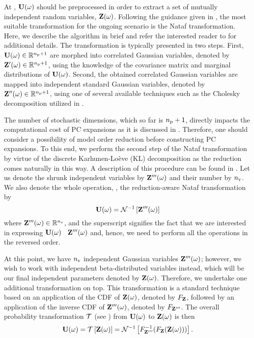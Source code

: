 At , $\mathbf{U}(\omega)$ should be preprocessed in order to extract a set of mutually independent random variables, $\mathbf{Z}(\omega)$.
Following the guidance given in , the most suitable transformation for the ongoing scenario is the Nataf transformation.
Here, we describe the algorithm in brief and refer the interested reader to \cite{li2008} for additional details. The transformation is typically presented in two steps.
First, $\mathbf{U}(\omega) \in \mathbb{R}^{{n_\text{p}} + 1}$ are morphed into correlated Gaussian variables, denoted by $\mathbf{Z}'(\omega) \in \mathbb{R}^{{n_\text{p}} + 1}$, using the knowledge of the covariance matrix and marginal distributions of $\mathbf{U}(\omega)$.
Second, the obtained correlated Gaussian variables are mapped into independent standard Gaussian variables, denoted by $\mathbf{Z}''(\omega) \in \mathbb{R}^{{n_\text{p}} + 1}$, using one of several available techniques such as the Cholesky decomposition \cite{press2007} utilized in \cite{li2008}.

The number of stochastic dimensions, which so far is ${n_\text{p}} + 1$, directly impacts the computational cost of PC expansions as it is discussed in .
Therefore, one should consider a possibility of model order reduction before constructing PC expansions.
To this end, we perform the second step of the Nataf transformation by virtue of the discrete Karhunen-Lo\`{e}ve (KL) decomposition \cite{ghanem1991} as the reduction comes naturally in this way.
A description of this procedure can be found in .
Let us denote the shrunk independent variables by $\mathbf{Z}'''(\omega)$ and their number by ${n_\text{v}}$.
We also denote the whole operation, \ie, the reduction-aware Nataf transformation by
\[
  \mathbf{U}(\omega) = \mathcal{N}^{-1}\left[\mathbf{Z}'''(\omega)\right]
\]
where $\mathbf{Z}'''(\omega) \in \mathbb{R}^{n_\text{v}}$, and the superscript signifies the fact that we are interested in expressing $\mathbf{U}(\omega)$ \via\ $\mathbf{Z}'''(\omega)$ and, hence, we need to perform all the operations in the reversed order.

At this point, we have ${n_\text{v}}$ independent Gaussian variables $\mathbf{Z}'''(\omega)$; however, we wish to work with independent beta-distributed variables instead, which will be our final independent parameters denoted by $\mathbf{Z}(\omega)$.
Therefore, we undertake one additional transformation on top.
This transformation is a standard technique \cite{durrett2010} based on an application of the CDF of $\mathbf{Z}(\omega)$, denoted by $F_{\mathbf{Z}}$, followed by an application of the inverse CDF of $\mathbf{Z}'''(\omega)$, denoted by $F_{\mathbf{Z}'''}$.
The overall probability transformation $\oTransform$ (see ) from $\mathbf{U}(\omega)$ to $\mathbf{Z}(\omega)$ is then
\[
  \vU(\o) = \oTransform{\vZ(\o)} = \oInvNataf{\fCDF^{-1}_{\vZ'''}(\fCDF_{\vZ}(\vZ(\o)))}.
\]
